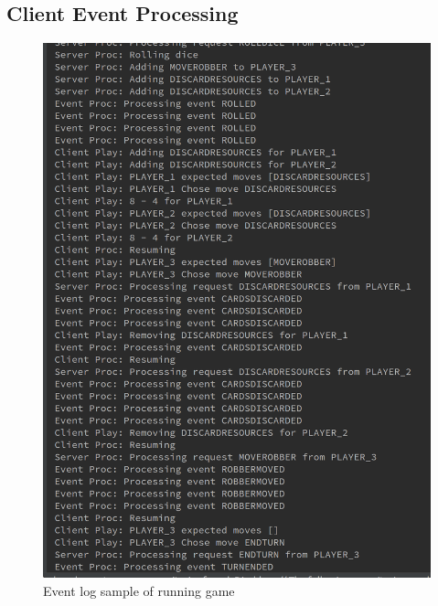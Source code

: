 \documentclass[a4paper,doc,draftfirst]{apa6}
\begin{document}
\subsection{Client Event Processing}
\begin{figure}[hbtp]
      \includegraphics[width=\textwidth]{eventlog}
      \caption{Event log sample of running game}
\end{figure}
\end{document}
